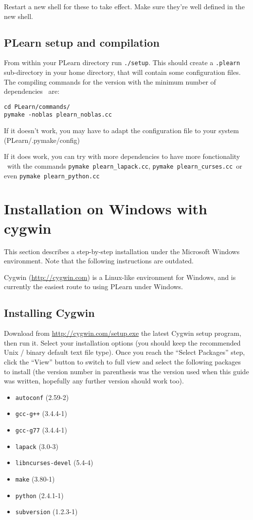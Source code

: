 \documentclass[11pt]{book}
\begin{document}
Restart a new shell for these to take effect. Make sure they're well
defined in the new shell.

\subsection{PLearn setup and compilation}

From within your PLearn directory run {\tt ./setup}. This should create a
{\tt .plearn} sub-directory in your home directory, that will contain some
configuration files.
The compiling commands for the version with the minimum number of dependencies \
are:
\begin{verbatim}
cd PLearn/commands/
pymake -noblas plearn_noblas.cc
\end{verbatim}

If it doesn't work, you may have to adapt the configuration file to your system
(PLearn/.pymake/config)

If it does work, you can try with more dependencies to have more fonctionality \
with the commands \verb!pymake plearn_lapack.cc!, \verb!pymake plearn_curses.cc!\
 or even \verb!pymake plearn_python.cc!


\section{Installation on Windows with cygwin}
\label{sec:windows}

This section describes a step-by-step installation under the Microsoft Windows environment.
Note that the following instructions are outdated.

Cygwin (\url{http://cygwin.com}) is a Linux-like environment for Windows, and is
currently the easiest route to using PLearn under Windows.

\subsection{Installing Cygwin}
Download from \url{http://cygwin.com/setup.exe} the latest Cygwin setup program,
then run it.
Select your installation options (you should keep the recommended Unix / binary default
text file type).
Once you reach the ``Select Packages'' step, click the ``View'' button to switch
to full view and select the following packages to install (the version number in
parenthesis was the version used when this guide was written, hopefully any further
version should work too).

\begin{itemize}
\item \verb!autoconf! (2.59-2)
\item \verb!gcc-g++! (3.4.4-1)
\item \verb!gcc-g77! (3.4.4-1)
\item \verb!lapack! (3.0-3)
\item \verb!libncurses-devel! (5.4-4)
\item \verb!make! (3.80-1)
\item \verb!python! (2.4.1-1)
\item \verb!subversion! (1.2.3-1)
\end{itemize}
\end{document}
